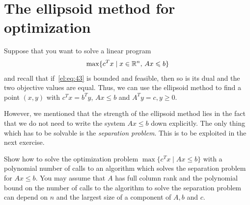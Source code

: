 



\section{The ellipsoid method for optimization}
\label{el:sec:ellips-meth-optim}

Suppose that you want to solve a linear program 
\begin{equation}
  \label{el:eq:43}
  \max \{ c^Tx \mid x \in \mathbb{R}^n, \, Ax\leqslant b\} 
\end{equation}
and recall that if~\eqref{el:eq:43} is bounded and feasible, then so is
its dual and the two objective values are equal. Thus, we can use the
ellipsoid method to find a point $(x,y)$  with $c^Tx = b^Ty$, $Ax\leq b$
and $A^Ty=c, y\geq0$. 


However, we mentioned that the strength of the ellipsoid method lies
in the fact that we do not need to write the system $Ax\leq b$ down
explicitly. The only thing which has to be solvable is the
\emph{separation problem}. This is to be exploited in the next
exercise. 


\begin{exercise}
  \label{el:ex:12}
  Show how to solve the optimization problem $\max\{c^Tx \mid Ax\leq b\}$
  with a polynomial number of calls to an algorithm which solves the
  separation problem for $Ax\leq b$. You may assume that $A$ has full
  column rank and the polynomial bound on the number of calls to the
  algorithm to    solve the separation problem can depend on $n$ and
  the largest size of a component of $A,b$ and $c$. 
\end{exercise}


